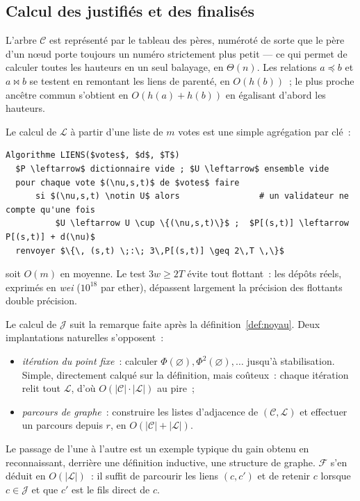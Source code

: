 \documentclass[11pt,a4paper]{article}
\theoremstyle{plain}
\theoremstyle{definition}
\newcommand{\Cc}{\mathcal{C}}
\newcommand{\Ll}{\mathcal{L}}
\newcommand{\Jj}{\mathcal{J}}
\newcommand{\Ff}{\mathcal{F}}
\newcommand{\anc}{\preccurlyeq}
\begin{document}
\subsection{Calcul des justifiés et des finalisés}

L'arbre $\Cc$ est représenté par le tableau des pères, numéroté de sorte que le père d'un
n\oe ud porte toujours un numéro strictement plus petit — ce qui permet de calculer toutes
les hauteurs en un seul balayage, en $\Theta(n)$. Les relations $a\anc b$ et $a\bowtie b$ se
testent en remontant les liens de parenté, en $O(h(b))$~; le plus proche ancêtre commun
s'obtient en $O(h(a)+h(b))$ en égalisant d'abord les hauteurs.

Le calcul de $\Ll$ à partir d'une liste de $m$ votes est une simple agrégation par clé~:
\begin{lstlisting}
Algorithme LIENS($votes$, $d$, $T$)
  $P \leftarrow$ dictionnaire vide ; $U \leftarrow$ ensemble vide
  pour chaque vote $(\nu,s,t)$ de $votes$ faire
      si $(\nu,s,t) \notin U$ alors                # un validateur ne compte qu'une fois
          $U \leftarrow U \cup \{(\nu,s,t)\}$ ;  $P[(s,t)] \leftarrow P[(s,t)] + d(\nu)$
  renvoyer $\{\, (s,t) \;:\; 3\,P[(s,t)] \geq 2\,T \,\}$
\end{lstlisting}
soit $O(m)$ en moyenne. Le test $3w\ge 2T$ évite tout flottant~: les dépôts réels, exprimés
en \emph{wei} ($10^{18}$ par ether), dépassent largement la précision des flottants double
précision.

Le calcul de $\Jj$ suit la remarque faite après la définition~\ref{def:noyau}. Deux
implantations naturelles s'opposent~:
\begin{itemize}[leftmargin=1.4em,itemsep=2pt]
\item \emph{itération du point fixe}~: calculer $\Phi(\varnothing),\Phi^2(\varnothing),\dots$
jusqu'à stabilisation. Simple, directement calqué sur la définition, mais coûteux~: chaque
itération relit tout $\Ll$, d'où $O(|\Cc|\cdot|\Ll|)$ au pire~;
\item \emph{parcours de graphe}~: construire les listes d'adjacence de $(\Cc,\Ll)$ et
effectuer un parcours depuis $r$, en $O(|\Cc|+|\Ll|)$.
\end{itemize}
Le passage de l'une à l'autre est un exemple typique du gain obtenu en reconnaissant, derrière
une définition inductive, une structure de graphe. $\Ff$ s'en déduit en $O(|\Ll|)$~: il suffit
de parcourir les liens $(c,c')$ et de retenir $c$ lorsque $c\in\Jj$ et que $c'$ est le fils
direct de $c$.
\end{document}
